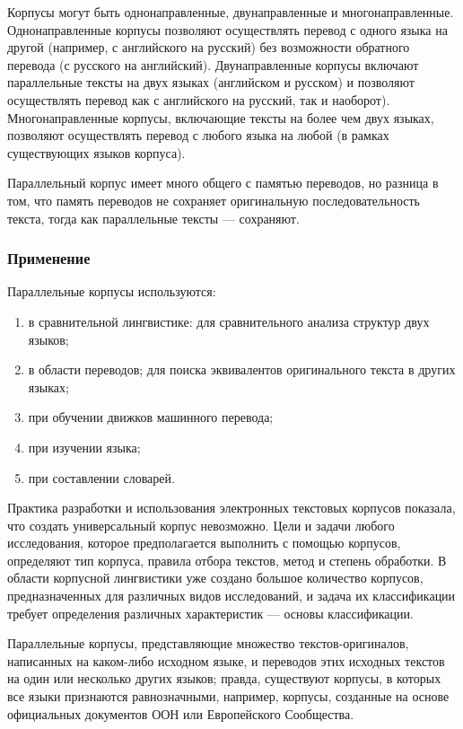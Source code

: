 Корпусы могут быть однонаправленные, двунаправленные и многонаправленные.
Однонаправленные корпусы позволяют осуществлять перевод с одного языка на другой (например, с английского на русский) без возможности обратного перевода (с русского на английский).
Двунаправленные корпусы включают параллельные тексты на двух языках (английском и русском) и позволяют осуществлять перевод как с английского на русский, так и наоборот).
Многонаправленные корпусы, включающие тексты на более чем двух языках, позволяют осуществлять перевод с любого языка на любой (в рамках существующих языков корпуса).

Параллельный корпус имеет много общего с памятью переводов, но разница в том, что память переводов не сохраняет оригинальную последовательность текста, тогда как параллельные тексты — сохраняют.~\cite{butenko2020-1}

\subsubsection{Применение}

Параллельные корпусы используются: 
\begin{enumerate}
    \item в сравнительной лингвистике: для сравнительного анализа структур двух языков; 
    \item в области переводов; для поиска эквивалентов оригинального текста в других языках; 
    \item при обучении движков машинного перевода; 
    \item при изучении языка; 
    \item при составлении словарей. 
\end{enumerate}

Практика разработки и использования электронных текстовых корпусов показала, что создать универсальный корпус невозможно.
Цели и задачи любого исследования, которое предполагается выполнить с помощью корпусов, определяют тип корпуса, правила отбора текстов, метод и степень обработки.
В области корпусной лингвистики уже создано большое количество корпусов, предназначенных для различных видов исследований, и задача их классификации требует определения различных характеристик --- основы классификации.

Параллельные корпусы, представляющие множество текстов-оригиналов, написанных на каком-либо исходном языке, и переводов этих исходных текстов на один или несколько других языков; правда, существуют корпусы, в которых все языки признаются равнозначными, например, корпусы, созданные на основе официальных документов ООН или Европейского Сообщества.


